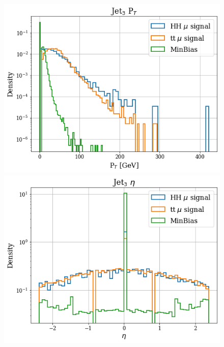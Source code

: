 \documentclass[../main.tex]{subfiles}
\begin{document}
\begin{figure}[h]
  \begin{minipage}[b]{0.33\linewidth}
    \centering
    \includegraphics[width=1\linewidth]{Chapters/Plots/Hist_1mu_jet3_Et.png}
  \end{minipage}%
  \begin{minipage}[b]{0.33\linewidth}
    \centering
    \includegraphics[width=1\linewidth]{Chapters/Plots/Hist_1mu_jet3_Eta.png}
  \end{minipage} %
  \begin{minipage}[b]{0.33\linewidth}

\end{minipage}
\end{figure}
\end{document}
